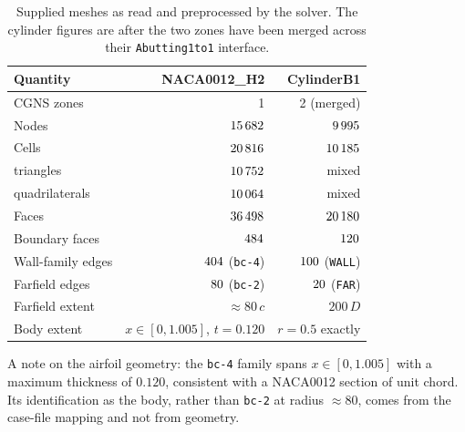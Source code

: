 \begin{table}[htbp]
  \centering
  \caption{Supplied meshes as read and preprocessed by the solver. The cylinder
  figures are after the two zones have been merged across their
  \texttt{Abutting1to1} interface.}
  \label{tab:meshes}
  \small
  \begin{tabular}{lrr}
    \toprule
    Quantity & NACA0012\_H2 & CylinderB1 \\
    \midrule
    CGNS zones & 1 & 2 (merged) \\
    Nodes & $15\,682$ & $9\,995$ \\
    Cells & $20\,816$ & $10\,185$ \\
    \quad triangles & $10\,752$ & mixed \\
    \quad quadrilaterals & $10\,064$ & mixed \\
    Faces & $36\,498$ & $20\,180$ \\
    Boundary faces & $484$ & $120$ \\
    Wall-family edges & $404$ (\texttt{bc-4}) & $100$ (\texttt{WALL}) \\
    Farfield edges & $80$ (\texttt{bc-2}) & $20$ (\texttt{FAR}) \\
    Farfield extent & $\approx 80\,c$ & $200\,D$ \\
    Body extent & $x\in[0,1.005]$, $t=0.120$ & $r=0.5$ exactly \\
    \bottomrule
  \end{tabular}
\end{table}

A note on the airfoil geometry: the \texttt{bc-4} family spans $x\in[0,1.005]$
with a maximum thickness of $0.120$, consistent with a NACA0012 section of unit
chord. Its identification as the body, rather than \texttt{bc-2} at radius
$\approx 80$, comes from the case-file mapping and not from geometry.
